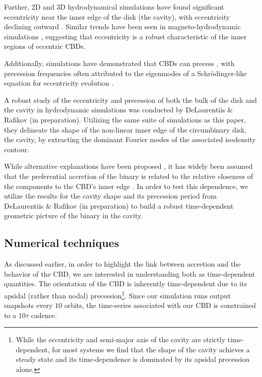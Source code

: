 \documentclass[fleqn,usenatbib]{mnras}
\begin{document}
Further, 2D and 3D hydrodynamical simulations have found significant eccentricity near the inner edge of the disk (the cavity), with eccentricity declining outward \citep{MacFadyen_08, miranda_munoz_lai_2017, siwek_prefacc, ragusa_lynch}. Similar trends have been seen in magneto-hydrodynamic simulations \citep{shi_2012}, suggesting that eccentricity is a robust characteristic of the inner regions of eccentric CBDs.

Additionally, simulations have demonstrated that CBDs can precess \citep{nelson_2003, shi_2012, miranda_munoz_lai_2017, Thun_2017, siwek_prefacc}, with precession frequencies often attributed to the eigenmodes of a Schrödinger-like equation for eccentricity evolution \citep{Goodchild_2006, shi_2012, Teyssandier_2016, Lee_2019, munoz_lithwick_2020, Lubow_2022}.


A robust study of the eccentricity and precession of both the bulk of the disk and the cavity in hydrodynamic simulations was conducted by DeLaurentiis \& Rafikov (in preparation). Utilizing the same suite of simulations as this paper, they delineate the shape of the non-linear inner edge of the circumbinary disk, the cavity, by extracting the dominant Fourier modes of the associated isodensity contour.


While alternative explanations have been proposed \citep{Artimowicz_83_og_polish}, it has widely been assumed that the preferential accretion of the binary is related to the relative closeness of the components to the CBD's inner edge \citep{Rafikov_16_accretion}. In order to test this dependence, we utilize the results for the cavity shape and its precession period from DeLaurentiis \& Rafikov (in preparation) to build a robust time-dependent geometric picture of the binary in the cavity.


\subsection{Numerical techniques}
As discussed earlier, in order to highlight the link between accretion and the behavior of the CBD, we are interested in understanding both as time-dependent quantities. The orientation of the CBD is inherently time-dependent due to its apsidal (rather than nodal) precession\footnote{While the eccentricity and semi-major axis of the cavity are strictly time-dependent, for most systems we find that the shape of the cavity achieves a steady state and its time-dependence is dominated by its apsidal precession alone.}. Since our simulation runs output snapshots every $10$ orbits, the time-series associated with our CBD is constrained to a $10 \tau$ cadence.
\end{document}
